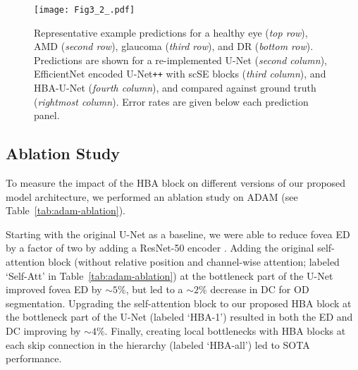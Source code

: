 \documentclass[hidelinks,runningheads]{llncs}
\begin{document}
\begin{figure}[!t]
    \centering
    \texttt{[image: Fig3\_2\_.pdf]}
    \caption{Representative example predictions for a healthy eye (\emph{top row}), \ac{AMD} (\emph{second row}), glaucoma (\emph{third row}), and \ac{DR} (\emph{bottom row}).
    Predictions are shown for a re-implemented U-Net (\emph{second column}), EfficientNet encoded U-Net\texttt{++} with scSE blocks (\emph{third column}), and HBA-U-Net (\emph{fourth column}), and compared against ground truth (\emph{rightmost column}). Error rates are given below each prediction panel.
    }
    \label{fig:example-predictions}
\end{figure}


\subsection{Ablation Study}

To measure the impact of the HBA block on different versions of our proposed model architecture, we performed an ablation study on ADAM (see Table~\ref{tab:adam-ablation}).

Starting with the original U-Net \cite{ronneberger_u-net_2015,meyer_pixel-wise_2018} as a baseline, we were able to reduce fovea \ac{ED} by a factor of two by adding a ResNet-50 encoder \cite{he_deep_2016}.
Adding the original self-attention block \cite{ramachandran_stand-alone_2019} (without relative position and channel-wise attention; labeled `Self-Att' in Table~\ref{tab:adam-ablation}) at the bottleneck part of the U-Net improved fovea \ac{ED} by $\sim 5\%$, but led to a $\sim 2\%$ decrease in \ac{DC} for \ac{OD} segmentation. 
Upgrading the self-attention block to our proposed HBA block at the bottleneck part of the U-Net (labeled `HBA-1') resulted in both the \ac{ED} and \ac{DC} improving by $\sim 4\%$. Finally, creating local bottlenecks with HBA blocks at each skip connection in the hierarchy (labeled `HBA-all') led to \ac{SOTA} performance.
\end{document}
